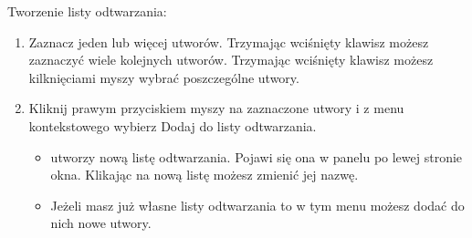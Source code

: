 Tworzenie listy odtwarzania:
\begin{enumerate}
\item Zaznacz jeden lub więcej utworów. Trzymając wciśnięty klawisz  możesz zaznaczyć wiele kolejnych utworów. Trzymając wciśnięty klawisz  możesz kilknięciami myszy wybrać poszczególne utwory.
\item  Kliknij prawym przyciskiem myszy na zaznaczone utwory i z menu kontekstowego wybierz \textcolor{ubuntu_orange}{Dodaj do listy odtwarzania}.
\begin{itemize}
\item {} utworzy nową listę odtwarzania. Pojawi się ona w panelu po lewej stronie okna. Klikając na nową listę możesz zmienić jej nazwę.
\item Jeżeli masz już własne listy odtwarzania to w tym menu możesz dodać do nich nowe utwory.
\end{itemize}
\end{enumerate}